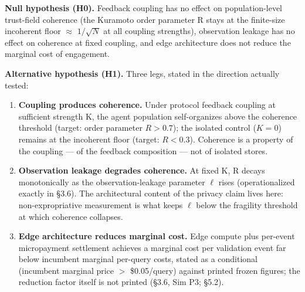 \documentclass[11pt,twocolumn]{article}
\providecommand{\tightlist}{\setlength{\itemsep}{0pt}\setlength{\parskip}{0pt}}
\begin{document}
\textbf{Null hypothesis (H0).} Feedback coupling has no effect on
population-level trust-field coherence (the Kuramoto order parameter R
stays at the finite-size incoherent floor \(\approx\) \(1/\sqrt{N}\) at
all coupling strengths), observation leakage has no effect on coherence
at fixed coupling, and edge architecture does not reduce the marginal
cost of engagement.

\textbf{Alternative hypothesis (H1).} Three legs, stated in the
direction actually tested:

\begin{enumerate}
\def\labelenumi{\arabic{enumi}.}
\tightlist
\item
  \textbf{Coupling produces coherence.} Under protocol feedback coupling
  at sufficient strength K, the agent population self-organizes above
  the coherence threshold (target: order parameter \(R > 0.7\)); the
  isolated control (\(K = 0\)) remains at the incoherent floor (target:
  \(R < 0.3\)). Coherence is a property of the coupling --- of the
  feedback composition --- not of isolated stores.
\item
  \textbf{Observation leakage degrades coherence.} At fixed K, R decays
  monotonically as the observation-leakage parameter \(\ell\) rises
  (operationalized exactly in §3.6). The architectural content of the
  privacy claim lives here: non-expropriative measurement is what keeps
  \(\ell\) below the fragility threshold at which coherence collapses.
\item
  \textbf{Edge architecture reduces marginal cost.} Edge compute plus
  per-event micropayment settlement achieves a marginal cost per
  validation event far below incumbent marginal per-query costs,
  stated as a conditional (incumbent marginal price \(>\) \$0.05/query)
  against printed frozen figures; the reduction factor itself is not
  printed (§3.6, Sim P3; §5.2).
\end{enumerate}
\end{document}
